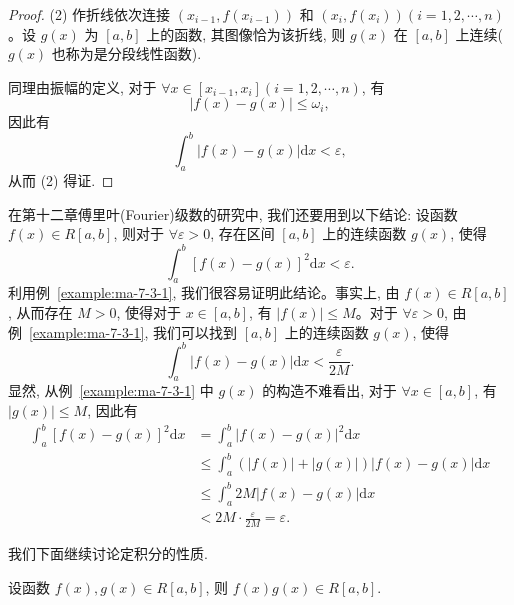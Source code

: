 \begin{proof}
(2) 作折线依次连接 $(x_{i-1},f(x_{i-1}))$ 和 $(x_i,f(x_i))(i=1,2,\cdots,n)$。设 $g(x)$ 为 $[a,b]$ 上的函数, 其图像恰为该折线, 则 $g(x)$ 在 $[a,b]$ 上连续($g(x)$ 也称为是分段线性函数).

同理由振幅的定义, 对于 $\forall x\in[x_{i-1},x_i](i=1,2,\cdots,n)$, 有
\begin{equation}
  |f(x)-g(x)|\leq\omega_i,
  \label{eq:ma-7-3-4}
\end{equation}
因此有
\[
  \int_a^b |f(x)-g(x)|\mathrm dx<\varepsilon,
\]
从而 (2) 得证.
\end{proof}


\begin{remark}\label{remark:ma-7-source-41}
在第十二章傅里叶(Fourier)级数的研究中, 我们还要用到以下结论: 设函数 $f(x)\in R[a,b]$, 则对于 $\forall\varepsilon>0$, 存在区间 $[a,b]$ 上的连续函数 $g(x)$, 使得
\[
  \int_a^b [f(x)-g(x)]^2\mathrm dx<\varepsilon.
\]
利用例~\ref{example:ma-7-3-1}, 我们很容易证明此结论。事实上, 由 $f(x)\in R[a,b]$, 从而存在 $M>0$, 使得对于 $x\in[a,b]$, 有 $|f(x)|\leq M$。对于 $\forall\varepsilon>0$, 由例~\ref{example:ma-7-3-1}, 我们可以找到 $[a,b]$ 上的连续函数 $g(x)$, 使得
\[
  \int_a^b |f(x)-g(x)|\mathrm dx<\frac{\varepsilon}{2M}.
\]
显然, 从例~\ref{example:ma-7-3-1} 中 $g(x)$ 的构造不难看出, 对于 $\forall x\in[a,b]$, 有 $|g(x)|\leq M$, 因此有
\[
\begin{aligned}
  \int_a^b [f(x)-g(x)]^2\mathrm dx
  &=\int_a^b |f(x)-g(x)|^2\mathrm dx\\
  &\leq \int_a^b (|f(x)|+|g(x)|)|f(x)-g(x)|\mathrm dx\\
  &\leq \int_a^b 2M|f(x)-g(x)|\mathrm dx\\
  &<2M\cdot\frac{\varepsilon}{2M}=\varepsilon.
\end{aligned}
\]
\end{remark}

我们下面继续讨论定积分的性质.

\begin{theorem}\label{theorem:ma-7-3-5}
设函数 $f(x),g(x)\in R[a,b]$, 则 $f(x)g(x)\in R[a,b]$.
\end{theorem}


